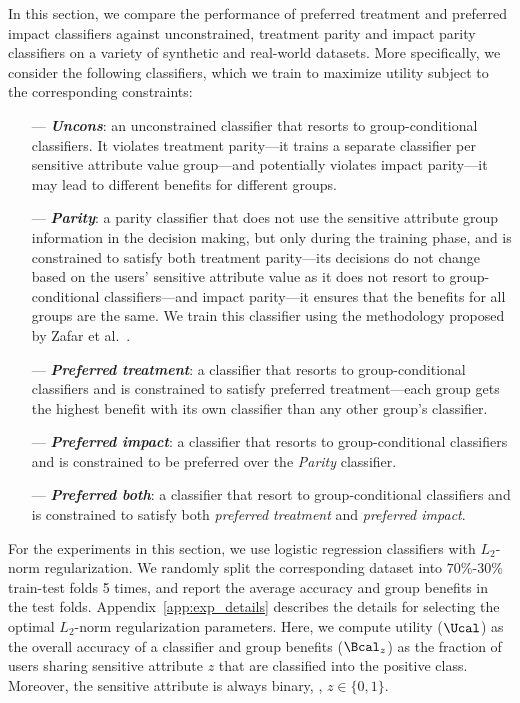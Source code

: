 \documentclass{article}
\newcommand{\emphb}[1]{\textbf{\emph{#1}}}
\begin{document}
In this section, we compare the performance of preferred treatment and preferred impact classifiers against unconstrained, treatment parity and impact parity classifiers on
a variety of synthetic and real-world datasets. More specifically, we consider the following classifiers, which we train to maximize utility subject to the corresponding
constraints:
\vspace{-2mm}
\begin{itemize}[leftmargin=6mm]
\item[---] \emphb{Uncons}: an unconstrained classifier that resorts to group-conditional classifiers. It violates treatment parity---it trains a separate classifier per sensitive attribute value
group---and potentially violates impact parity---it may lead to different benefits for different groups.
\item[---] \emphb{Parity}: a parity classifier that does not use the sensitive attribute group information in the decision making, but only during the training phase, and is constrained to satisfy both treatment parity---its
decisions do not change based on the users' sensitive attribute value as it does not resort to group-conditional classifiers---and impact parity---it ensures that the benefits for all groups are the same. We train
this classifier using the methodology proposed by Zafar et al.~\cite{zafar_fairness}.
\item[---] \emphb{Preferred treatment}: a classifier that resorts to group-conditional classifiers and  is constrained to satisfy preferred treatment---each group gets the highest benefit with its own classifier than any
other group'{}s classifier.
\item[---] \emphb{Preferred impact}: a classifier that resorts to group-conditional classifiers and is constrained to be preferred over the \emph{Parity} classifier.
\item[---] \emphb{Preferred both}: a classifier that resort to group-conditional classifiers and  is constrained to satisfy both \emph{preferred treatment} and \emph{preferred impact}.
\end{itemize}
\vspace{-1mm}

For the experiments in this section, we use logistic regression classifiers with $L_2$-norm regularization. We randomly split the corresponding dataset into $70\%$-$30\%$ train-test folds 5 times, and report the average
accuracy and group benefits in the test folds. Appendix~\ref{app:exp_details} describes the details for selecting the optimal $L_2$-norm regularization parameters.
Here, we compute utility ($\Ucal$) as the overall accuracy of a classifier and group benefits ($\Bcal_z$) as the fraction of users sharing
sensitive attribute $z$ that are classified into the positive class.
Moreover, the sensitive attribute is always binary, \ie, $z \in \{0, 1\}$.
\end{document}
